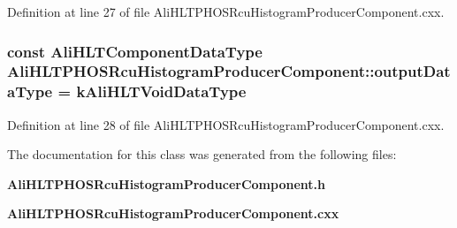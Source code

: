 Definition at line 27 of file Ali\-HLTPHOSRcu\-Histogram\-Producer\-Component.cxx.
\subsubsection{\setlength{\rightskip}{0pt plus 5cm}const {\bf Ali\-HLTComponent\-Data\-Type} {\bf Ali\-HLTPHOSRcu\-Histogram\-Producer\-Component::output\-Data\-Type} = {\bf k\-Ali\-HLTVoid\-Data\-Type}\hspace{0.3cm}{\tt  [static, private]}}\label{classAliHLTPHOSRcuHistogramProducerComponent_v1}




Definition at line 28 of file Ali\-HLTPHOSRcu\-Histogram\-Producer\-Component.cxx.

The documentation for this class was generated from the following files:\begin{CompactItemize}
\item 
{\bf Ali\-HLTPHOSRcu\-Histogram\-Producer\-Component.h}\item 
{\bf Ali\-HLTPHOSRcu\-Histogram\-Producer\-Component.cxx}\end{CompactItemize}
